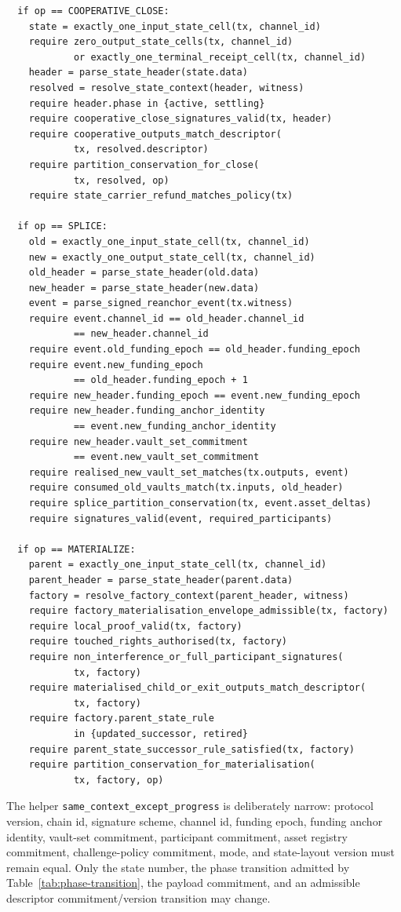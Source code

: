 \documentclass[a4paper,11pt]{article}
\begin{document}
\begin{lstlisting}
  if op == COOPERATIVE_CLOSE:
    state = exactly_one_input_state_cell(tx, channel_id)
    require zero_output_state_cells(tx, channel_id)
            or exactly_one_terminal_receipt_cell(tx, channel_id)
    header = parse_state_header(state.data)
    resolved = resolve_state_context(header, witness)
    require header.phase in {active, settling}
    require cooperative_close_signatures_valid(tx, header)
    require cooperative_outputs_match_descriptor(
            tx, resolved.descriptor)
    require partition_conservation_for_close(
            tx, resolved, op)
    require state_carrier_refund_matches_policy(tx)

  if op == SPLICE:
    old = exactly_one_input_state_cell(tx, channel_id)
    new = exactly_one_output_state_cell(tx, channel_id)
    old_header = parse_state_header(old.data)
    new_header = parse_state_header(new.data)
    event = parse_signed_reanchor_event(tx.witness)
    require event.channel_id == old_header.channel_id
            == new_header.channel_id
    require event.old_funding_epoch == old_header.funding_epoch
    require event.new_funding_epoch
            == old_header.funding_epoch + 1
    require new_header.funding_epoch == event.new_funding_epoch
    require new_header.funding_anchor_identity
            == event.new_funding_anchor_identity
    require new_header.vault_set_commitment
            == event.new_vault_set_commitment
    require realised_new_vault_set_matches(tx.outputs, event)
    require consumed_old_vaults_match(tx.inputs, old_header)
    require splice_partition_conservation(tx, event.asset_deltas)
    require signatures_valid(event, required_participants)

  if op == MATERIALIZE:
    parent = exactly_one_input_state_cell(tx, channel_id)
    parent_header = parse_state_header(parent.data)
    factory = resolve_factory_context(parent_header, witness)
    require factory_materialisation_envelope_admissible(tx, factory)
    require local_proof_valid(tx, factory)
    require touched_rights_authorised(tx, factory)
    require non_interference_or_full_participant_signatures(
            tx, factory)
    require materialised_child_or_exit_outputs_match_descriptor(
            tx, factory)
    require factory.parent_state_rule
            in {updated_successor, retired}
    require parent_state_successor_rule_satisfied(tx, factory)
    require partition_conservation_for_materialisation(
            tx, factory, op)
\end{lstlisting}

The helper \texttt{same\_context\_except\_progress} is deliberately narrow:
protocol version, chain id, signature scheme, channel id, funding epoch,
funding anchor identity, vault-set commitment, participant commitment, asset
registry commitment, challenge-policy commitment, mode, and state-layout version
must remain equal. Only the state number, the phase transition admitted by
Table~\ref{tab:phase-transition}, the payload commitment, and an admissible
descriptor commitment/version transition may change.
\end{document}
